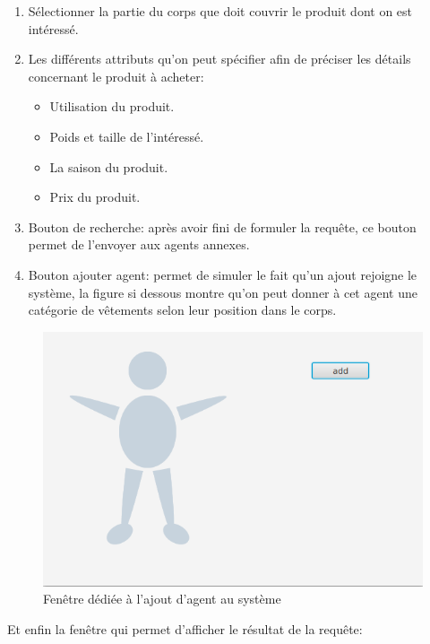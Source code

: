 \begin{enumerate}
	\item Sélectionner la partie du corps que doit couvrir le produit dont on est intéressé.
	\item Les différents attributs qu’on peut spécifier afin de préciser les détails concernant le produit à acheter:
	\begin{itemize}
		\item Utilisation du produit.
		\item Poids et taille de l’intéressé.
		\item La saison du produit.
		\item Prix du produit.
	\end{itemize}
	\item Bouton de recherche: après avoir fini de formuler la requête, ce bouton permet de l’envoyer aux agents annexes.
	\item Bouton ajouter agent: permet de simuler le fait qu’un ajout rejoigne le système, la figure si dessous montre qu’on peut donner à cet agent une catégorie de vêtements selon leur position dans le corps.
\end{enumerate}
\begin{figure}[H]
	\centering
	\includegraphics[scale=0.4]{imgs/agentUI3.png}
	\caption{Fenêtre dédiée à l'ajout d'agent au système}
	\label{fig:addAgent}
\end{figure}
\newpage
Et enfin la fenêtre qui permet d’afficher le résultat de la requête:
